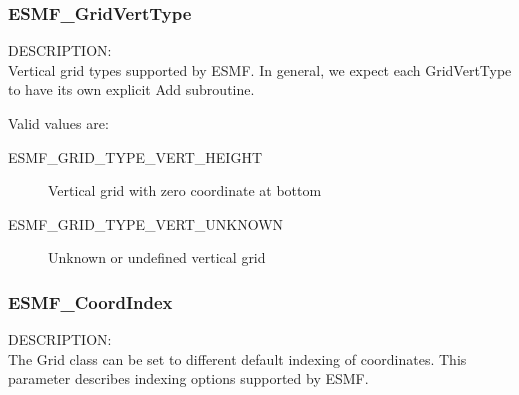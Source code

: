  \subsubsection{ESMF\_GridVertType}
 
 {\sf DESCRIPTION:\\}
 Vertical grid types supported by ESMF.  In general, we expect each GridVertType
 to have its own explicit Add subroutine.
 
 Valid values are:
 \begin{description}
    \item [ESMF\_GRID\_TYPE\_VERT\_HEIGHT]
          Vertical grid with zero coordinate at bottom
    \item [ESMF\_GRID\_TYPE\_VERT\_UNKNOWN]
          Unknown or undefined vertical grid

 \end{description}

\subsubsection{ESMF\_CoordIndex}

{\sf DESCRIPTION:\\}
The Grid class can be set to different default indexing of coordinates.  This
parameter describes indexing options supported by ESMF.

